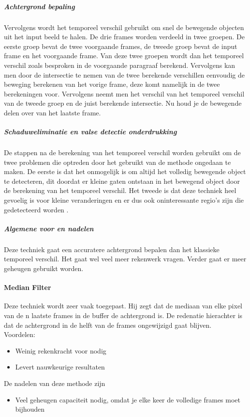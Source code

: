\subparagraph{Achtergrond bepaling}
Vervolgens wordt het temporeel verschil gebruikt om snel de bewegende objecten uit het input beeld te halen. De drie frames worden verdeeld in twee groepen. De eerste groep bevat de twee voorgaande frames, de tweede groep bevat de input frame en het voorgaande frame. Van deze twee groepen wordt dan het temporeel verschil zoals besproken in de voorgaande paragraaf berekend. Vervolgens kan men door de intersectie te nemen van de twee berekende verschillen eenvoudig de beweging berekenen van het vorige frame, deze komt namelijk in de twee berekeningen voor. Vervolgens neemt men het verschil van het temporeel verschil van de tweede groep en de juist berekende intersectie. Nu houd je de bewegende delen over van het laatste frame.

\subparagraph{Schaduweliminatie en valse detectie onderdrukking}
De stappen na de berekening van het temporeel verschil worden gebruikt om de twee problemen die optreden door het gebruikt van de methode ongedaan te maken. De eerste is dat het onmogelijk is om altijd het volledig bewegende object te detecteren, dit doordat er kleine gaten ontstaan in het bewegend object door de berekening van het temporeel verschil. Het tweede is dat deze techniek heel gevoelig is voor kleine veranderingen en er dus ook oninteressante regio's zijn die gedetecteerd worden \cite{bibTeV}.

\subparagraph{Algemene voor en nadelen}
Deze techniek gaat een accuratere achtergrond bepalen dan het klassieke temporeel verschil. Het gaat wel veel meer rekenwerk vragen. Verder gaat er meer geheugen gebruikt worden.

\paragraph{Median Filter}
\label{refMEF}
Deze techniek wordt zeer vaak toegepast. Hij zegt dat de mediaan van elke pixel van de n laatste  frames in de buffer de achtergrond is. De redenatie hierachter is dat de achtergrond in de helft van de frames ongewijzigd gaat blijven.\\
Voordelen:
\begin{itemize}
	\item Weinig rekenkracht voor nodig
	\item Levert nauwkeurige resultaten
\end{itemize}
De nadelen van deze methode zijn
\begin{itemize}
	\item Veel geheugen capaciteit nodig, omdat je elke keer de volledige frames moet bijhouden
\end{itemize}


